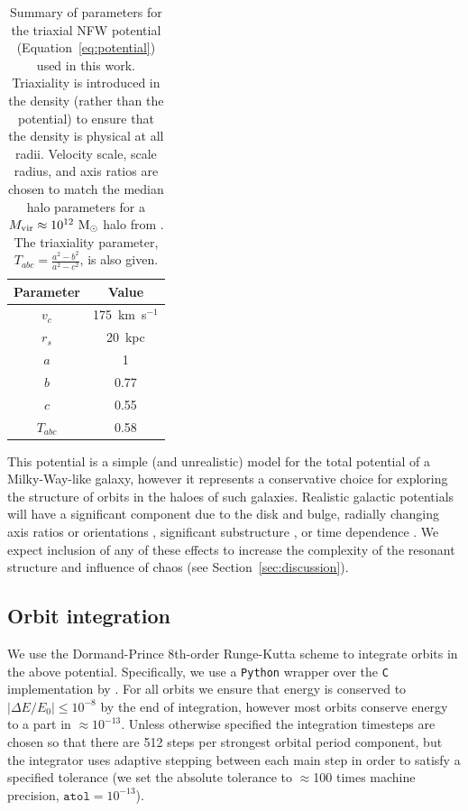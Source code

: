\documentclass{mn2e}
\newcommand{\msun}{\ensuremath{\mathrm{M}_\odot}}
\begin{document}
\begin{table}[ht]
\begin{center}
	\begin{tabular}{ c  c }
	         Parameter & Value\\\toprule
		$v_c$ & 175~km~s$^{-1}$\\
		$r_s$ & 20~kpc\\
		$a$ & 1\\
		$b$ & 0.77\\
		$c$ & 0.55\\
		\midrule
		$T_{abc}$ & 0.58\\
		\bottomrule
		\end{tabular}
	\caption{Summary of parameters for the triaxial NFW potential (Equation~\ref{eq:potential}) used in this work. Triaxiality is introduced in the density (rather than the potential) to ensure that the density is physical at all radii. Velocity scale, scale radius, and axis ratios are chosen to match the median halo parameters for a $M_{\rm vir} \approx 10^{12}~\msun$ halo from \citep{jing02}. The triaxiality parameter, $T_{abc} = \frac{a^2 - b^2}{a^2 - c^2}$, is also given. \label{tbl:potential}}
\end{center}
\end{table}

This potential is a simple (and unrealistic) model for the total potential of a Milky-Way-like galaxy, however it represents a conservative choice for exploring the structure of orbits in the haloes of such galaxies. Realistic galactic potentials will have a significant component due to the disk and bulge, radially changing axis ratios or orientations \citep[e.g.,][]{romanowsky98, kazantzidis04,debattista08,veraciro11,butsky15}, significant substructure \citep{moore98,zemp09}, or time dependence \citep[either from bulk rotation, mass growth, mergers, etc.; see, e.g.,][]{bailin05}. We expect inclusion of any of these effects to increase the complexity of the resonant structure and influence of chaos (see Section~\ref{sec:discussion}).

\subsection{Orbit integration}\label{sec:integration}

We use the Dormand-Prince 8th-order Runge-Kutta scheme \citep{prince81} to integrate orbits in the above potential. Specifically, we use a \texttt{Python} wrapper over the \texttt{C} implementation by \cite{hairer93}. For all orbits we ensure that energy is conserved to $|\Delta E/E_0| \leq 10^{-8}$ by the end of integration, however most orbits conserve energy to a part in $\approx$$10^{-13}$. Unless otherwise specified the integration timesteps are chosen so that there are 512 steps per strongest orbital period component, but the integrator uses adaptive stepping between each main step in order to satisfy a specified tolerance (we set the absolute tolerance to $\approx$100 times machine precision, $\texttt{atol} = 10^{-13}$).
\end{document}
